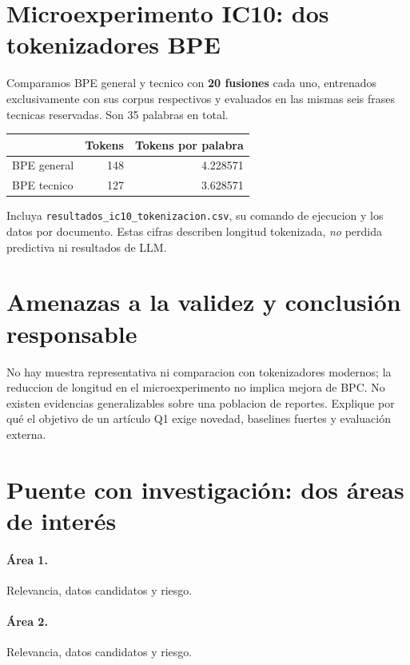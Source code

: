\documentclass[11pt,a4paper]{article}
\begin{document}
\section{Microexperimento IC10: dos tokenizadores BPE}
Comparamos BPE general y tecnico con \textbf{20 fusiones} cada uno,
entrenados exclusivamente con sus corpus respectivos y evaluados en
las mismas seis frases tecnicas reservadas. Son 35 palabras en total.
\begin{center}\begin{tabular}{lrr}\toprule
& Tokens & Tokens por palabra\\\midrule
BPE general &148&4.228571\\
BPE tecnico &127&3.628571\\\bottomrule
\end{tabular}\end{center}
Incluya \texttt{resultados\_ic10\_tokenizacion.csv}, su comando de
ejecucion y los datos por documento. Estas cifras describen longitud
tokenizada, \emph{no} perdida predictiva ni resultados de LLM.
\section{Amenazas a la validez y conclusión responsable}
No hay muestra representativa ni comparacion con tokenizadores modernos;
la reduccion de longitud en el microexperimento no implica mejora de BPC.
No existen evidencias generalizables sobre una poblacion de reportes. Explique por qué el objetivo de un
artículo Q1 exige novedad, baselines fuertes y evaluación externa.
\section{Puente con investigación: dos áreas de interés}
\paragraph{Área 1.} Relevancia, datos candidatos y riesgo.
\paragraph{Área 2.} Relevancia, datos candidatos y riesgo.
\end{document}
